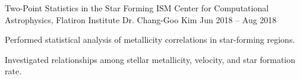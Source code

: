 \begin{research}
{Two-Point Statistics in the Star Forming ISM}
{Center for Computational Astrophysics, Flatiron Institute}
{Dr. Chang-Goo Kim}
{Jun 2018 -- Aug 2018}
    \item Performed statistical analysis of metallicity correlations in star-forming regions.
    \item Investigated relationships among stellar metallicity, velocity, and star formation rate.
\end{research}